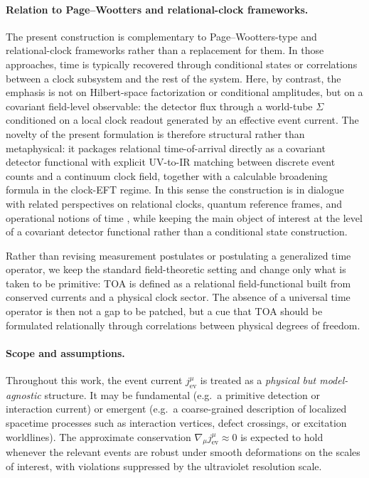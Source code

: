 \documentclass[pdflatex,sn-mathphys-num]{sn-jnl}
\theoremstyle{thmstylethree}
\theoremstyle{thmstyleone}
\theoremstyle{thmstyletwo}
\numberwithin{equation}{section}
\begin{document}
        \paragraph{Relation to Page--Wootters and relational-clock frameworks.}
            The present construction is complementary to Page--Wootters-type and relational-clock frameworks rather than a replacement for them. In those approaches, time is typically recovered through conditional states or correlations between a clock subsystem and the rest of the system. Here, by contrast, the emphasis is not on Hilbert-space factorization or conditional amplitudes, but on a covariant field-level observable: the detector flux through a world-tube $\Sigma$ conditioned on a local clock readout generated by an effective event current. The novelty of the present formulation is therefore structural rather than metaphysical: it packages relational time-of-arrival directly as a covariant detector functional with explicit UV-to-IR matching between discrete event counts and a continuum clock field, together with a calculable broadening formula in the clock-EFT regime. In this sense the construction is in dialogue with related perspectives on relational clocks, quantum reference frames, and operational notions of time \cite{GambiniPullin2021,HohnSmith2020,Giovannetti2015}, while keeping the main object of interest at the level of a covariant detector functional rather than a conditional state construction.
            
            Rather than revising measurement postulates or postulating a generalized time operator, we keep the standard field-theoretic setting and change only what is taken to be primitive: TOA is defined as a relational field-functional built from conserved currents and a physical clock sector. The absence of a universal time operator is then not a gap to be patched, but a cue that TOA should be formulated relationally through correlations between physical degrees of freedom.
            
        
        \paragraph{Scope and assumptions.}
            Throughout this work, the event current $j^\mu_{\mathrm{ev}}$ is treated as a \emph{physical but model-agnostic} structure. It may be fundamental (e.g.\ a primitive detection or interaction current) or emergent (e.g.\ a coarse-grained description of localized spacetime processes such as interaction vertices, defect crossings, or excitation worldlines). The approximate conservation $\nabla_\mu j^\mu_{\mathrm{ev}}\approx 0$ is expected to hold whenever the relevant events are robust under smooth deformations on the scales of interest, with violations suppressed by the ultraviolet resolution scale.
            
\end{document}
